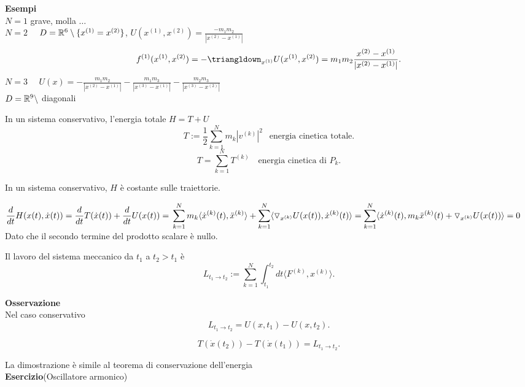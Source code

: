 \documentclass[12px]{article}
\begin{document}
\newpage
\textbf{Esempi}\\
$N = 1$ grave, molla $\ldots$\\
$N = 2$ \ \  $D = \mathbb{R}^6\setminus\{x^{(1)}=x^{(2)}\}$,  $U(x^{(1)},x^{(2)}) = \frac{-m_1m_2}{|x^{(2)} -x^{(1)}|}$\\
\[
	f^{(1)}(x^{(1)}, x^{(2)}) = -\triangldown_{x^{(1)}}U(x^{(1)}, x^{(2)}) = m_1m_2\frac{x^{(2)} - x^{(1)}}{|x^{(2)} - x^{(1)}|}
.\] 
$N = 3$ \ \  $U(x) = -\frac{m_1m_2}{|x^{(2)} - x^{(1)}|} -\frac{m_1m_3}{|x^{(3)} - x^{(1)}|} - \frac{m_2m_3}{|x^{(3)} - x^{(2)}|}$\\
$D = \mathbb{R}^9\setminus $ diagonali\\
\begin{defi}
	In un sistema conservativo, l'energia totale $H = T + U$
	 \[
		 T := \frac 12 \sum^N_{k=1} m_k |v^{(k)}|^2 \ \ \text{ energia cinetica totale}
	.\] 
	\[
		T = \sum^N_{k=1} T^{(k)} \ \ \ \text{ energia cinetica di } P_k
	.\] 
\end{defi}
\begin{teo}
	In un sistema conservativo, $H$ è costante sulle traiettorie.
\end{teo}
\begin{dimo}
	$\displaystyle\frac{d }{d t}H(x(t),\dot x(t)) = \frac{d }{d t} T(\dot x(t)) + \frac{d }{d t}U(x(t))= \\ \sum^N_{k=1}m_k \langle \dot x^{(k)}(t), \ddot x^{(k)} \rangle  + \sum^N_{k=1} \langle \triangledown_{x^{(k)}}U(x(t)), \dot x^{(k)}(t) \rangle \\
	= \sum^N_{k=1} \langle \dot x ^{(k)}(t)	, m_k\ddot x^{(k)}(t) + \triangledown _{x^{(k)}}U(x(t))  \rangle  = 0$ \\ 
	Dato che il secondo termine del prodotto scalare è nullo.
\end{dimo}
\begin{defi}[Lavoro]
	Il lavoro del sistema meccanico da $t_1$ a $t_2> t_1$ è
	\[
		L_{t_1 \rightarrow t_2} := \sum^N_{k=1} \int_{t_1}^{t_2}dt \langle F^{(k)}, x^{(k)} \rangle 
	.\] 
\end{defi}
\textbf{Osservazione}\\
Nel caso conservativo
\[
	L_{t_1 \rightarrow t_2}  = U(x,t_1) - U(x,t_2)
.\] 
\begin{teo}
	\[
		T(\dot x(t_2)) - T(\dot x(t_1)) = L_{t_1 \rightarrow t_2}
	.\] 
\end{teo}
La dimostrazione è simile al teorema di conservazione dell'energia\\
\textbf{Esercizio}(Oscillatore armonico)\\
\end{document}
